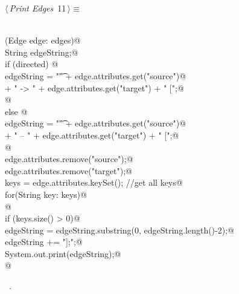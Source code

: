 \documentclass[a4paper]{report}
\begin{document}
\begin{flushleft} \small
\begin{minipage}{\linewidth}\label{scrap11}\raggedright\small
{} $\langle\,${\itshape Print Edges}\nobreak\ {\footnotesize {11}}$\,\rangle\equiv$
\vspace{-1ex}
\begin{list}{}{} \item
\mbox{}\verb@@\\
\mbox{}\verb@for (Edge edge: edges){@\\
\mbox{}\verb@        String edgeString;@\\
\mbox{}\verb@        if (directed) {@\\
\mbox{}\verb@                edgeString = "\t" + edge.attributes.get("source")@\\
\mbox{}\verb@                        + " -> " + edge.attributes.get("target") + " [";@\\
\mbox{}\verb@        }@\\
\mbox{}\verb@        else {@\\
\mbox{}\verb@                edgeString = "\t" + edge.attributes.get("source")@\\
\mbox{}\verb@                        + " -- " + edge.attributes.get("target") + " [";@\\
\mbox{}\verb@        }@\\
\mbox{}\verb@        edge.attributes.remove("source");@\\
\mbox{}\verb@        edge.attributes.remove("target");@\\
\mbox{}\verb@        keys = edge.attributes.keySet();  //get all keys@\\
\mbox{}\verb@        for(String key: keys)@\\
\mbox{}@\\
\mbox{}\verb@        if (keys.size() > 0)@\\
\mbox{}\verb@                edgeString = edgeString.substring(0, edgeString.length()-2);@\\
\mbox{}\verb@        edgeString += "];\n";@\\
\mbox{}\verb@        System.out.print(edgeString);@\\
\mbox{}\verb@}@\\
\mbox{}\verb@@{\NWsep}
\end{list}
\vspace{-1.5ex}
\footnotesize
\begin{list}{}{\setlength{\itemsep}{-\parsep}\setlength{\itemindent}{-\leftmargin}}
\item \NWtxtMacroRefIn\ .

\item{}
\end{list}
\end{minipage}\vspace{4ex}
\end{flushleft}
\end{document}
